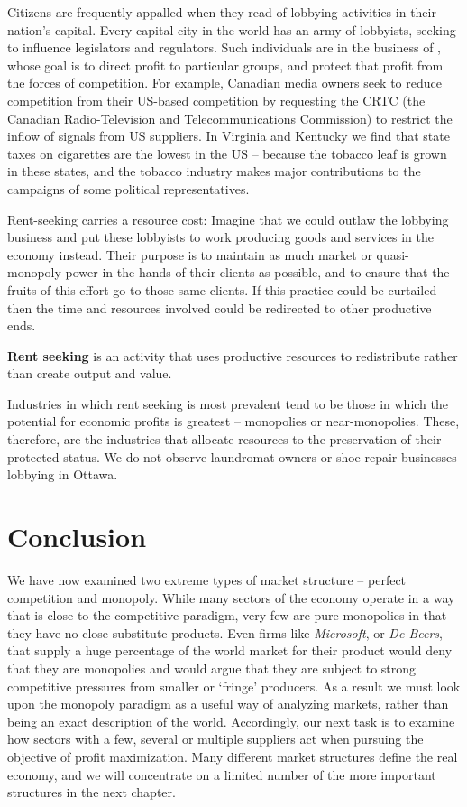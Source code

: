Citizens are frequently appalled when they read of lobbying activities in their 
nation's capital. Every capital city in the world has an army of lobbyists, 
seeking to influence legislators and regulators. Such individuals are in the 
business of , whose goal is to direct profit to 
particular groups, and protect that profit from the forces of competition. 
For example, Canadian media owners  seek to reduce competition from their 
US-based competition by requesting the CRTC (the Canadian Radio-Television 
and Telecommunications Commission) to restrict the inflow of signals from US 
suppliers. In Virginia and Kentucky we find that state taxes on cigarettes are 
the lowest in the US -- because the tobacco leaf is grown in these states, 
and the tobacco industry makes major contributions to the campaigns of some 
political representatives. 

Rent-seeking carries a resource cost: Imagine that we could outlaw the lobbying 
business and put these lobbyists to work producing goods and services in the 
economy instead. Their purpose is to maintain as much market or quasi-monopoly 
power in the hands of their clients as possible, and to ensure that the fruits 
of this effort go to those same clients. If this practice could be curtailed then 
the time and resources involved could be redirected to other productive ends.

\begin{DefBox}
\textbf{Rent seeking} is an activity that uses productive resources to redistribute rather than create output and value.
\end{DefBox}

Industries in which rent seeking is most prevalent tend to be those in which 
the potential for economic profits is greatest -- monopolies or near-monopolies. 
These, therefore, are the industries that allocate resources to the preservation 
of their protected status. We do not observe laundromat owners or shoe-repair 
businesses lobbying in Ottawa. 

\section*{Conclusion}

We have now examined two extreme types of market structure -- perfect competition 
and monopoly.  While many sectors of the economy operate in a way that is close 
to the competitive paradigm, very few are pure monopolies in that they have no close 
substitute products. Even firms like \textit{Microsoft}, or \textit{De Beers}, that supply a huge 
percentage of the world market for their product would deny that they are monopolies 
and would argue that they are subject to strong competitive pressures from smaller 
or `fringe' producers. As a result we must look upon the monopoly paradigm as a useful 
way of analyzing markets, rather than being an exact description of the world. 
Accordingly, our next task is to examine how sectors with a few, several or multiple 
suppliers act when pursuing the objective of profit maximization. Many different 
market structures define the real economy, and we will concentrate on a limited 
number of the more important structures in the next chapter.